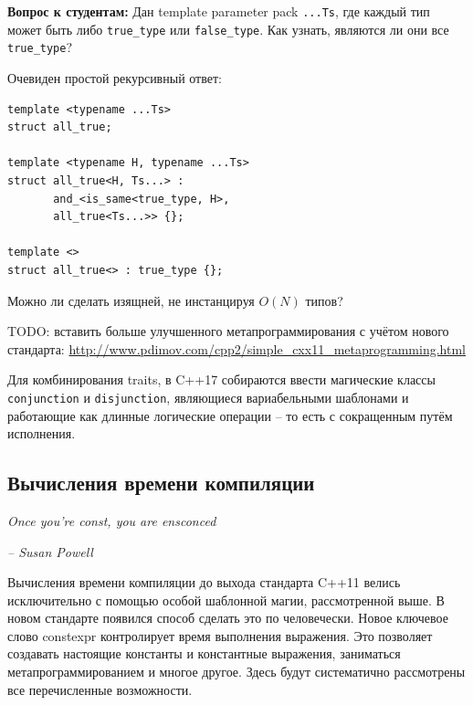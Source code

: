 \documentclass[a4paper,12pt,oneside]{article}
\newif\ifanswers
\begin{document}
\textbf{Вопрос к студентам:} Дан template parameter pack \lstinline!...Ts!, где каждый тип может быть либо \lstinline!true_type! или \lstinline!false_type!. Как узнать, являются ли они все \lstinline!true_type!?

Очевиден простой рекурсивный ответ:

\begin{lstlisting}
template <typename ...Ts>
struct all_true;

template <typename H, typename ...Ts>
struct all_true<H, Ts...> : 
       and_<is_same<true_type, H>, 
       all_true<Ts...>> {};

template <>
struct all_true<> : true_type {};
\end{lstlisting}

Можно ли сделать изящней, не инстанцируя $O(N)$ типов?

\ifanswers
Более просветляющий ответ использует кортежи:

\begin{lstlisting}
template <typename H, typename ...Ts>
struct all_true<H, Ts...> : 
       and_<is_same<true_type, H>, 
       is_same<tuple<H,Ts...>,
               tuple<Ts...,H>>> {};
\end{lstlisting}
\fi

TODO: вставить больше улучшенного метапрограммирования с учётом нового стандарта:
\url{http://www.pdimov.com/cpp2/simple_cxx11_metaprogramming.html}

Для комбинирования traits, в C++17 собираются ввести магические классы \lstinline!conjunction! и \lstinline!disjunction!, являющиеся вариабельными шаблонами и работающие как длинные логические операции -- то есть с сокращенным путём исполнения.

\pagebreak
\subsection{Вычисления времени компиляции}

\hfill\textit{Once you're const, you are ensconced}{\vspace{0.5em}}

\hfill\textit{-- Susan Powell}

Вычисления времени компиляции до выхода стандарта C++11 велись исключительно с помощью особой шаблонной магии, рассмотренной выше. В новом стандарте появился способ сделать это по человечески. Новое ключевое слово constexpr контролирует время выполнения выражения. Это позволяет создавать настоящие константы и константные выражения, заниматься метапрограммированием и многое другое. Здесь будут систематично рассмотрены все перечисленные возможности.
\end{document}
